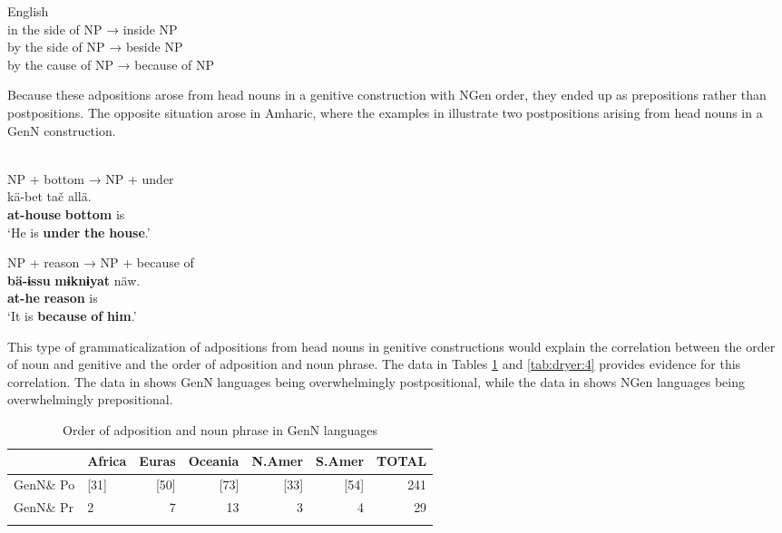 \documentclass[output=paper]{langsci/langscibook}
\begin{document}
\ea\label{ex:dryer:8}
{English}\\
\ea in the side of NP → inside NP\\
\ex by the side of NP → beside NP\\
\ex by the cause of NP → because of NP\\
\z
\z

Because these adpositions arose from head nouns in a genitive construction with NGen order, they ended up as prepositions rather than postpositions. The opposite situation arose in Amharic, where the examples in  illustrate two postpositions arising from head nouns in a GenN construction.

\ea\label{ex:dryer:9}
 \\
\ea
NP + bottom → NP + under\\

\gll   kä-bet    tač    allä.\\
       \textbf{at-house}  \textbf{bottom}  is\\
\glt   ‘He is \textbf{under} \textbf{the} \textbf{house}.’

\ex  NP + reason → NP + because of\\

\gll   \textbf{bä-ɨssu}  \textbf{mɨknɨyat}  näw.\\
       \textbf{at-he}    \textbf{reason}  is\\
\glt   ‘It is \textbf{because} \textbf{of} \textbf{him}.’
\z
\z

This type of grammaticalization of adpositions from head nouns in genitive constructions would explain the correlation between the order of noun and genitive and the order of adposition and noun phrase. The data in Tables \ref{tab:dryer:3} and \ref{tab:dryer:4} provides evidence for this correlation. The data in  shows GenN languages being overwhelmingly postpositional, while the data in  shows NGen languages being overwhelmingly prepositional.

\begin{table}
\begin{tabularx}{\textwidth}{Xlrrrrr}
\lsptoprule
& \bfseries Africa & \bfseries Euras & \bfseries Oceania & \bfseries N.Amer & \bfseries S.Amer & \bfseries TOTAL\\
\midrule 
GenN\& Po & [31] & [50] & [73] & [33] & [54] & 241\\
GenN\& Pr & 2 & 7 & 13 & 3 & 4 & 29\\
\lspbottomrule
\end{tabularx}
\caption{\label{tab:dryer:3}Order of adposition and noun phrase in GenN languages}
\end{table}
\end{document}
